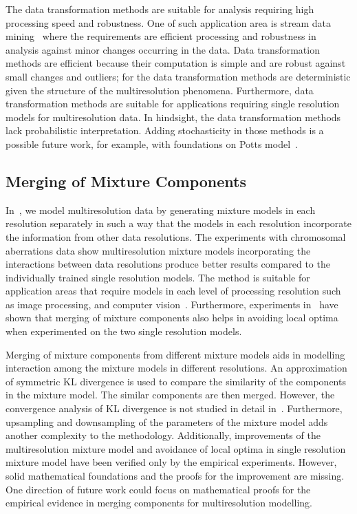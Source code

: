 The data transformation methods are suitable for analysis requiring
high processing speed and robustness. One of such application 
area is stream data mining~\cite{aggarwal2007data,gaber2005,gama2014,indre2014} 
where the requirements are efficient processing and  robustness
in analysis against minor changes occurring in the data. 
Data transformation methods are efficient because
their computation is simple and are robust against small 
changes and outliers; for the data transformation methods
are deterministic given the structure of the multiresolution 
phenomena. Furthermore, data transformation methods are suitable
for applications requiring single resolution models for 
multiresolution data. In hindsight, the data transformation
methods lack probabilistic interpretation. Adding stochasticity in 
those methods is a possible future work, for example,
with foundations on Potts model~\cite{baxter08,potts52}.

\subsection{Merging of Mixture Components}
\label{ss:dmergingmixcompo}

In~, we model multiresolution data by generating mixture 
models in each resolution separately in such a way that the models 
in each resolution incorporate the information from other data 
resolutions. The experiments with  chromosomal aberrations data show 
multiresolution mixture models incorporating the interactions 
between data resolutions produce better results compared to the 
individually trained single resolution models. 
The method is suitable for application areas that require models in 
each level of processing resolution such as image processing, 
and computer vision~\cite{sonka2008}. Furthermore, experiments 
in~ have  shown that merging of mixture components 
also helps in avoiding local optima when experimented on the two 
single resolution models.

Merging of mixture components from different mixture models aids
in modelling interaction among the mixture models in different 
resolutions. An approximation of symmetric KL divergence is used
to compare the similarity of the components in the mixture 
model. The similar components are then merged. However, the
convergence analysis of KL divergence is not studied in detail
in~. Furthermore, upsampling and downsampling of the 
parameters of the mixture model adds another complexity to the 
methodology. Additionally, improvements of the multiresolution 
mixture model and avoidance of local optima in single resolution
mixture model have been verified only by the empirical experiments. 
However, solid mathematical foundations and the proofs for the 
improvement are missing. One direction of future work could focus
on mathematical proofs for the empirical evidence in merging 
components for multiresolution modelling.

